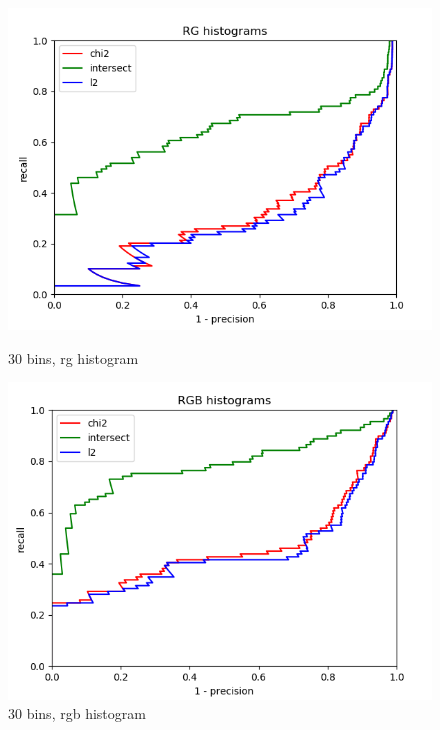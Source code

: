 \documentclass{article}
\begin{document}
\begin{figure}[ht]
    \centering
        \begin{minipage}{.5\textwidth}
        \includegraphics[width=\linewidth]{images/Q4.b-rg_histogram_30_bins.png}
        \cprotect\caption{30 bins, rg histogram}
    \end{minipage}\hfill
    \begin{minipage}{.5\textwidth}
        \includegraphics[width=\linewidth]{images/Q4.b-rgb_histogram_30_bins.png}
        \cprotect\caption{30 bins, rgb histogram}
    \end{minipage}
    \begin{minipage}{.5\textwidth}

\end{minipage}
\end{figure}
\end{document}
